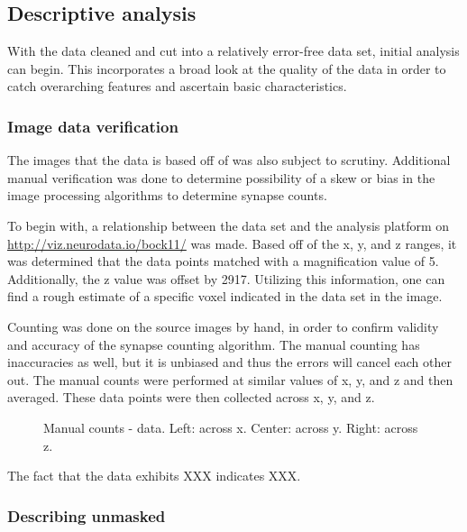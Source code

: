 \documentclass{article}
\begin{document}
\subsection{Descriptive analysis}

With the data cleaned and cut into a relatively error-free data set, initial analysis can begin. This incorporates a broad look at the quality of the data in order to catch overarching features and ascertain basic characteristics.

\subsubsection{Image data verification}

The images that the data is based off of was also subject to scrutiny. Additional manual verification was done to determine possibility of a skew or bias in the image processing algorithms to determine synapse counts.

To begin with, a relationship between the data set and the analysis platform on \url{http://viz.neurodata.io/bock11/} was made. Based off of the x, y, and z ranges, it was determined that the data points matched with a magnification value of 5. Additionally, the z value was offset by 2917. Utilizing this information, one can find a rough estimate of a specific voxel indicated in the data set in the image.

Counting was done on the source images by hand, in order to confirm validity and accuracy of the synapse counting algorithm. The manual counting has inaccuracies as well, but it is unbiased and thus the errors will cancel each other out. The manual counts were performed at similar values of x, y, and z and then averaged. These data points were then collected across x, y, and z.

\begin{figure}[h]
  \centering
  \fbox{\rule[-.5cm]{0cm}{4cm} \rule[-.5cm]{4cm}{0cm}}
  \fbox{\rule[-.5cm]{0cm}{4cm} \rule[-.5cm]{4cm}{0cm}}
  \fbox{\rule[-.5cm]{0cm}{4cm} \rule[-.5cm]{4cm}{0cm}}
  \caption{Manual counts - data. Left: across x. Center: across y. Right: across z.}
\end{figure}

The fact that the data exhibits XXX indicates XXX.

\subsubsection{Describing unmasked}
\end{document}
